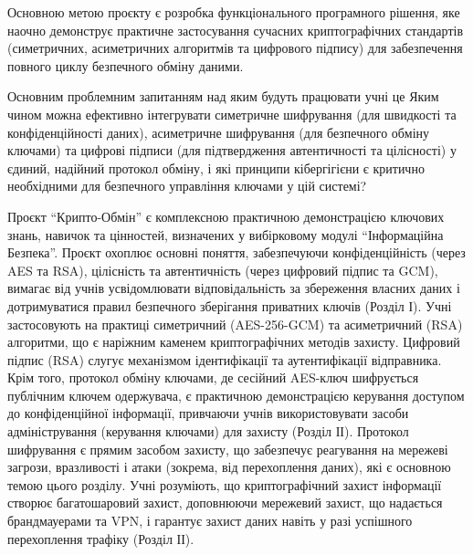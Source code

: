 Основною метою проєкту є розробка функціонального програмного рішення, яке наочно демонструє практичне застосування сучасних криптографічних стандартів (симетричних, асиметричних алгоритмів та цифрового підпису) для забезпечення повного циклу безпечного обміну даними.

Основним проблемним запитанням над яким будуть працювати учні це Яким чином можна ефективно інтегрувати симетричне шифрування (для швидкості та конфіденційності даних), асиметричне шифрування (для безпечного обміну ключами) та цифрові підписи (для підтвердження автентичності та цілісності) у єдиний, надійний протокол обміну, і які принципи кібергігієни є критично необхідними для безпечного управління ключами у цій системі?

Проєкт ``Крипто-Обмін'' є комплексною практичною демонстрацією ключових знань, навичок та цінностей, визначених у вибірковому модулі ``Інформаційна Безпека''. Проєкт охоплює основні поняття, забезпечуючи конфіденційність (через AES та RSA), цілісність та автентичність (через цифровий підпис та GCM), вимагає від учнів усвідомлювати відповідальність за збереження власних даних і дотримуватися правил безпечного зберігання приватних ключів (Розділ І). Учні застосовують на практиці симетричний (AES-256-GCM) та асиметричний (RSA) алгоритми, що є наріжним каменем криптографічних методів захисту. Цифровий підпис (RSA) слугує механізмом ідентифікації та аутентифікації відправника. Крім того, протокол обміну ключами, де сесійний AES-ключ шифрується публічним ключем одержувача, є практичною демонстрацією керування доступом до конфіденційної інформації, привчаючи учнів використовувати засоби адміністрування (керування ключами) для захисту (Розділ ІІ). Протокол шифрування є прямим засобом захисту, що забезпечує реагування на мережеві загрози, вразливості і атаки (зокрема, від перехоплення даних), які є основною темою цього розділу. Учні розуміють, що криптографічний захист інформації створює багатошаровий захист, доповнюючи мережевий захист, що надається брандмауерами та VPN, і гарантує захист даних навіть у разі успішного перехоплення трафіку (Розділ ІІ).

